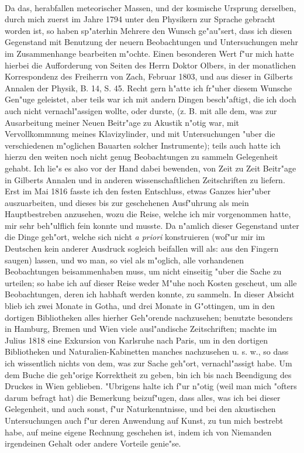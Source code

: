 \documentclass[a4paper, 11pt, oneside, polutonikogreek, german]{article}
\begin{document}
\paragraph{}
Da das, herabfallen meteorischer Massen, und der kosmische Ursprung derselben, durch mich zuerst im Jahre 1794 unter den Physikern zur Sprache gebracht worden ist, so haben sp"aterhin Mehrere den Wunsch ge"au"sert, dass ich diesen Gegenstand mit Benutzung der neuern Beobachtungen und Untersuchungen mehr im Zusammenhange bearbeiten m"ochte. Einen besonderen Wert f"ur mich hatte hierbei die Aufforderung von Seiten des Herrn Doktor Olbers, in der monatlichen Korrespondenz des Freiherrn von Zach, Februar 1803, und aus dieser in Gilberts Annalen der Physik, B. 14, S. 45. Recht gern h"atte ich fr"uher diesem Wunsche Gen"uge geleistet, aber teils war ich mit andern Dingen besch"aftigt, die ich doch auch nicht vernachl"assigen wollte, oder durste, (z. B. mit alle dem, was zur Ausarbeitung meiner Neuen Beitr"age zu Akustik n"otig war, mit Vervollkommnung meines Klavizylinder, und mit Untersuchungen "uber die verschiedenen m"oglichen Bauarten solcher Instrumente); teils auch hatte ich hierzu den weiten noch nicht genug Beobachtungen zu sammeln Gelegenheit gehabt. Ich lie"s es also vor der Hand dabei bewenden, von Zeit zu Zeit Beitr"age in Gilberts Annalen und in anderen wissenschaftlichen Zeitschriften zu liefern. Erst im Mai 1816 fasste ich den festen Entschluss, etwas Ganzes hier"uber auszuarbeiten, und dieses bis zur geschehenen Ausf"uhrung als mein Hauptbestreben anzusehen, wozu die Reise, welche ich mir vorgenommen hatte, mir sehr beh"ulflich fein konnte und musste. Da n"amlich dieser Gegenstand unter die Dinge geh"ort, welche sich nicht \emph{a priori} konstruieren (wof"ur mir im Deutschen kein anderer Ausdruck sogleich beifallen will als: aus den Fingern saugen) lassen, und wo man, so viel als m"oglich, alle vorhandenen Beobachtungen beisammenhaben muss, um nicht einseitig "uber die Sache zu urteilen; so habe ich auf dieser Reise weder M"uhe noch Kosten gescheut, um alle Beobachtungen, deren ich habhaft werden konnte, zu sammeln. In dieser Absicht blieb ich zwei Monate in Gotha, und drei Monate in G"ottingen, um in den dortigen Bibliotheken alles hierher Geh"orende nachzusehen; benutzte besonders in Hamburg, Bremen und Wien viele ausl"andische Zeitschriften; machte im Julius 1818 eine Exkursion von Karlsruhe nach Paris, um in den dortigen Bibliotheken und Naturalien-Kabinetten manches nachzusehen u. s. w., so dass ich wissentlich nichts von dem, was zur Sache geh"ort, vernachl"assigt habe. Um dem Buche die geh"orige Korrektheit zu geben, bin ich bis nach Beendigung des Druckes in Wien geblieben. "Ubrigens halte ich f"ur n"otig (weil man mich "ofters darum befragt hat) die Bemerkung beizuf"ugen, dass alles, was ich bei dieser Gelegenheit, und auch sonst, f"ur Naturkenntnisse, und bei den akustischen Untersuchungen auch f"ur deren Anwendung auf Kunst, zu tun mich bestrebt habe, auf meine eigene Rechnung geschehen ist, indem ich von Niemanden irgendeinen Gehalt oder andere Vorteile genie"se.
\end{document}
